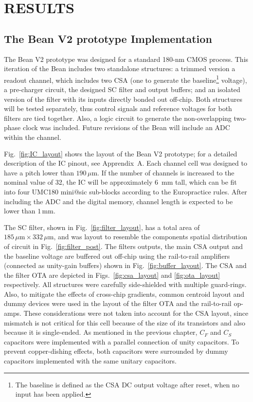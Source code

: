 \chapter{RESULTS}
\label{chapter:results}

\section{The Bean V2 prototype Implementation}
The Bean V2 prototype was designed for a standard 180-nm CMOS process. This iteration of the Bean includes two standalone structures: a trimmed version a readout channel, which includes two CSA (one to generate the baseline\footnote{The baseline is defined as the CSA DC output voltage after reset, when no input has been applied.} voltage), a pre-charger circuit, the designed SC filter and output buffers; and an isolated version of the filter with its inputs directly bonded out off-chip.  Both structures will be tested separately, thus control signals and reference voltages for both filters are tied together. Also, a logic circuit to generate the non-overlapping two-phase clock was included. Future revisions of the Bean will include an ADC within the channel.

Fig.~\ref{fig:IC_layout} shows the layout of the Bean V2 prototype; for a detailed description of the IC pinout, see Apprendix~A. Each channel cell was designed to have a pitch lower than $190\,\mu\text{m}$. If the number of channels is increased to the nominal value of 32, the IC will be approximately 6~mm tall, which can be fit into four UMC180 mini@sic sub-blocks according to the Europractice rules. After including the ADC and the digital memory, channel length is expected to be lower than $1\,\text{mm}$.

The SC filter, shown in Fig.~\ref{fig:filter_layout}, has a total area of $185\,\mu\text{m}\times 332\,\mu\text{m}$, and was layout to resemble the components spatial distribution of circuit in Fig.~\ref{fig:filter_post}. The filters outputs, the main CSA output and the baseline voltage are buffered out off-chip using the rail-to-rail amplifiers (connected as unity-gain buffers) shown in Fig.~\ref{fig:buffer_layout}. The CSA and the filter OTA are depicted in Figs.~\ref{fig:csa_layout} and \ref{fig:ota_layout} respectively. All structures were carefully side-shielded with multiple guard-rings. Also, to mitigate the effects of cross-chip gradients,  common centroid layout and dummy devices were used in the layout of the filter OTA and the rail-to-rail op-amps. These considerations were not taken into account for the CSA layout, since mismatch is not critical for this cell because of the size of its transistors and also because it is single-ended. As mentioned in the previous chapter, $C_F$ and $C_S$ capacitors were implemented with a parallel connection of unity capacitors. To prevent copper-dishing effects, both capacitors were surrounded by dummy capacitors implemented with the same unitary capacitors.

